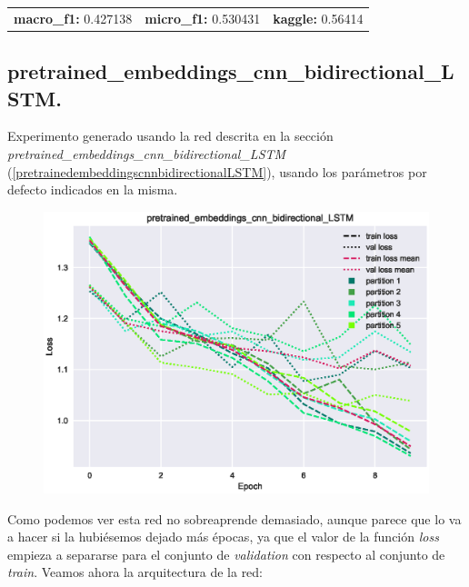 \documentclass[11pt]{article}
\begin{document}
\begin{table}[H]
\begin{tabular}{c|c|c}
\textbf{macro\_f1:} 0.427138 & \textbf{micro\_f1:} 0.530431 & \textbf{kaggle:} 0.56414
\end{tabular}
\end{table}

\subsection{pretrained\_embeddings\_cnn\_bidirectional\_LSTM.} \label{exp_pretrainedembeddingsbidirectionalLSTMCNNGRU}

Experimento generado usando la red descrita en la sección \textit{pretrained\_embeddings\_cnn\_bidirectional\_LSTM} (\ref{pretrainedembeddingscnnbidirectionalLSTM}), usando los parámetros por defecto indicados en la misma. 

\begin{figure}[H]
\includegraphics[width=\linewidth]{images/loss/pretrained_embeddings_cnn_bidirectional_LSTM-1554820745.eps}
\end{figure}

Como podemos ver esta red no sobreaprende demasiado, aunque parece que lo va a hacer si la hubiésemos dejado más épocas, ya que el valor de la función \textit{loss} empieza a separarse para el conjunto de \textit{validation} con respecto al conjunto de \textit{train}. Veamos ahora la arquitectura de la red:
\end{document}
